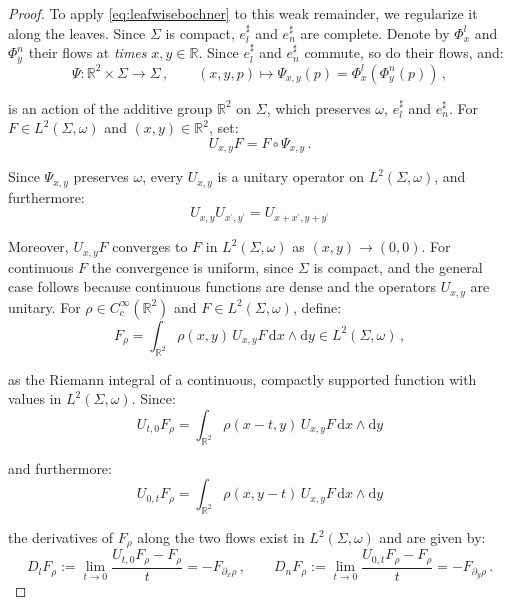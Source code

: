 \documentclass[10pt,reqno,a4paper]{amsart}
\theoremstyle{plain}
\theoremstyle{definition}
\theoremstyle{remark}
\theoremstyle{remark}
\def\dd{\mathrm{d}}
\renewcommand{\(}{ (}
\renewcommand{\)}{ )}
\begin{document}
\begin{proof}
\noindent 
To apply \eqref{eq:leafwisebochner} to this weak remainder, we regularize it along the leaves. Since $\Sigma$ is compact, $e_l^{\sharp}$ and $e_n^{\sharp}$ are complete. Denote by $\Phi^l_x$ and $\Phi^n_y$ their flows at \emph{times} $x,y\in\mathbb{R}$. Since $e_l^{\sharp}$ and $e_n^{\sharp}$ commute, so do their flows, and:
\begin{equation*}
\Psi\colon\mathbb{R}^2\times\Sigma\to\Sigma\, , \qquad (x,y,p)\mapsto\Psi_{x,y}(p) = \Phi^l_x(\Phi^n_y(p))\, ,
\end{equation*}

\noindent
is an action of the additive group $\mathbb{R}^2$ on $\Sigma$, which preserves $\omega$, $e_l^{\sharp}$ and $e_n^{\sharp}$. For $F\in L^2(\Sigma,\omega)$ and $(x,y)\in\mathbb{R}^2$, set:
\begin{equation*}
U_{x,y}F = F\circ\Psi_{x,y}\, .
\end{equation*}

\noindent
Since $\Psi_{x,y}$ preserves $\omega$, every $U_{x,y}$ is a unitary operator on $L^2(\Sigma,\omega)$, and furthermore:
\begin{equation*}
U_{x,y}U_{x^{\prime},y^{\prime}} = U_{x+x^{\prime},y+y^{\prime}}    
\end{equation*}

\noindent
Moreover, $U_{x,y}F$ converges to $F$ in $L^2(\Sigma,\omega)$ as $(x,y)\to(0,0)$. For continuous $F$ the convergence is uniform, since $\Sigma$ is compact, and the general case follows because continuous functions are dense and the operators $U_{x,y}$ are unitary. For $\rho\in C^{\infty}_c(\mathbb{R}^2)$ and $F\in L^2(\Sigma,\omega)$, define:
\begin{equation*}
F_{\rho} = \int_{\mathbb{R}^2}\rho(x,y)\, U_{x,y}F\,\dd x\wedge\dd y\in L^2(\Sigma,\omega)\, ,
\end{equation*}

\noindent
as the Riemann integral of a continuous, compactly supported function with values in $L^2(\Sigma,\omega)$. Since:
\begin{equation*}
U_{t,0}F_{\rho} = \int_{\mathbb{R}^2}\rho(x-t,y)\, U_{x,y}F\,\dd x\wedge\dd y    
\end{equation*}

\noindent
and furthermore:
\begin{equation*}
 U_{0,t}F_{\rho} = \int_{\mathbb{R}^2}\rho(x,y-t)\, U_{x,y}F\,\dd x\wedge \dd y   
\end{equation*}

\noindent
the derivatives of $F_{\rho}$ along the two flows exist in $L^2(\Sigma,\omega)$ and are given by:
\begin{equation*}
D_lF_{\rho} := \lim_{t\to 0}\frac{U_{t,0}F_{\rho}-F_{\rho}}{t} = -F_{\partial_x\rho}\, , \qquad D_nF_{\rho} := \lim_{t\to 0}\frac{U_{0,t}F_{\rho}-F_{\rho}}{t} = -F_{\partial_y\rho}\, .
\end{equation*}


\end{proof}
\end{document}
